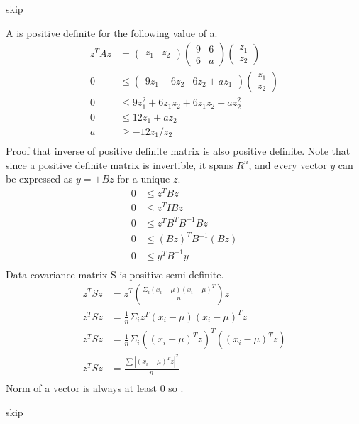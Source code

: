 \documentclass[newpage]{homework}
\begin{document}
\question
skip

\question
A is positive definite for the following value of a.
\begin{align*}
    z^TAz	&=	\begin{pmatrix}z_1&z_2\end{pmatrix} \begin{pmatrix}9&6\\6&a\end{pmatrix} \begin{pmatrix}z_1\\z_2\end{pmatrix}	\\
    0	&\leq	\begin{pmatrix}9z_1+6z_2&6z_2+az_1\end{pmatrix} \begin{pmatrix}z_1\\z_2\end{pmatrix}	\\
    0	&\leq	9z_1^2 + 6z_1z_2 + 6z_1 z_2 + az_2^2	\\
    0	&\leq	12z_1 + az_2	\\
    a	&\geq	\boxed{-12z_1/z_2}	\\
\end{align*}
Proof that inverse of positive definite matrix is also positive definite. Note that since a positive definite matrix is invertible, it spans $R^n$, and every vector $y$ can be expressed as $y = \pm Bz$ for a unique $z$.
\begin{align*}
    0   &\leq   z^T B z   \\
    0   &\leq   z^T I B z   \\
    0   &\leq   z^T B^T B^{-1} B z   \\
    0   &\leq   (Bz)^T B^{-1} (Bz)   \\
    0   &\leq   \boxed{y^T B^{-1} y }   \\
\end{align*}
Data covariance matrix S is positive semi-definite.
\begin{align*}
    z^T S z	&=	z^T \left( \frac{\Sigma_i (x_i-\mu)(x_i-\mu)^T}{n} \right) z	\\
    z^T S z	&=	\frac{1}{n} \Sigma_i z^T (x_i-\mu)(x_i-\mu)^T z	\\
    z^T S z	&=	\frac{1}{n} \Sigma_i ((x_i-\mu)^T z)^T ((x_i-\mu)^T z)	\\
    z^T S z	&=	\frac{\sum|(x_i-\mu)^T z|^2}{n} \\
\end{align*}
Norm of a vector is always at least 0 so .


\question
skip
\end{document}

